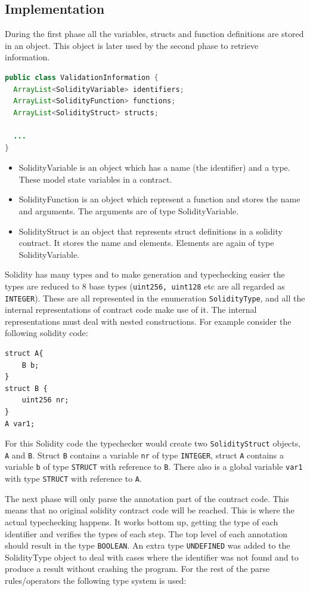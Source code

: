 \documentclass[a4paper]{article}
\begin{document}
\subsection{Implementation}
During the first phase all the variables, structs and function definitions are stored in an object. This object is later used by the second phase to retrieve information.
\begin{lstlisting}[breaklines=true, language=Java ]
public class ValidationInformation {
  ArrayList<SolidityVariable> identifiers;
  ArrayList<SolidityFunction> functions;
  ArrayList<SolidityStruct> structs;

  ...
}
\end{lstlisting}
\begin{itemize}
  \item SolidityVariable is an object which has a name (the identifier) and a type. These model state variables in a contract.
  \item SolidityFunction is an object which represent a function and stores the name and arguments. The arguments are of type SolidityVariable.
  \item SolidityStruct is an object that represents struct definitions in a solidity contract. It stores the name and elements. Elements are again of type SolidityVariable.
\end{itemize}
Solidity has many types and to make generation and typechecking easier the types are reduced to 8 base types (\texttt{uint256, uint128} etc are all regarded as \texttt{INTEGER}). These are all represented in the enumeration \texttt{SolidityType}, and all the internal representations of contract code make use of it. The internal representations must deal with nested constructions. For example consider the following solidity code:
\begin{lstlisting}[breaklines=true, language=Solidity ]
struct A{
    B b;
}
struct B {
    uint256 nr;
}
A var1;
\end{lstlisting}
For this Solidity code the typechecker would create two \texttt{SolidityStruct} objects, \texttt{A} and \texttt{B}. Struct \texttt{B} contains a variable \texttt{nr} of type \texttt{INTEGER}, struct \texttt{A} contains a variable \texttt{b} of type \texttt{STRUCT} with reference to \texttt{B}. There also is a global variable \texttt{var1} with type \texttt{STRUCT} with reference to \texttt{A}. \par
The next phase will only parse the annotation part of the contract code. This means that no original solidity contract code will be reached. This is where the actual typechecking happens. It works bottom up, getting the type of each identifier and verifies the types of each step. The top level of each annotation should result in the type \texttt{BOOLEAN}. An extra type \texttt{UNDEFINED} was added to the SolidityType object to deal with cases where the identifier was not found and to produce a result without crashing the program. For the rest of the parse rules/operators the following type system is used:
\end{document}
